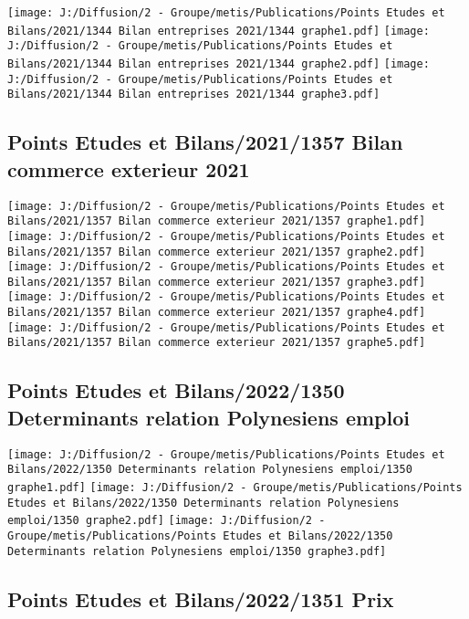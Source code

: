 \documentclass[
]{article}
\begin{document}
\texttt{[image: J:/Diffusion/2 - Groupe/metis/Publications/Points Etudes et Bilans/2021/1344 Bilan entreprises 2021/1344 graphe1.pdf]}
\texttt{[image: J:/Diffusion/2 - Groupe/metis/Publications/Points Etudes et Bilans/2021/1344 Bilan entreprises 2021/1344 graphe2.pdf]}
\texttt{[image: J:/Diffusion/2 - Groupe/metis/Publications/Points Etudes et Bilans/2021/1344 Bilan entreprises 2021/1344 graphe3.pdf]}

\hypertarget{points-etudes-et-bilans20211357-bilan-commerce-exterieur-2021}{%
\subsection{Points Etudes et Bilans/2021/1357 Bilan commerce exterieur
2021}\label{points-etudes-et-bilans20211357-bilan-commerce-exterieur-2021}}

\texttt{[image: J:/Diffusion/2 - Groupe/metis/Publications/Points Etudes et Bilans/2021/1357 Bilan commerce exterieur 2021/1357 graphe1.pdf]}
\texttt{[image: J:/Diffusion/2 - Groupe/metis/Publications/Points Etudes et Bilans/2021/1357 Bilan commerce exterieur 2021/1357 graphe2.pdf]}
\texttt{[image: J:/Diffusion/2 - Groupe/metis/Publications/Points Etudes et Bilans/2021/1357 Bilan commerce exterieur 2021/1357 graphe3.pdf]}
\texttt{[image: J:/Diffusion/2 - Groupe/metis/Publications/Points Etudes et Bilans/2021/1357 Bilan commerce exterieur 2021/1357 graphe4.pdf]}
\texttt{[image: J:/Diffusion/2 - Groupe/metis/Publications/Points Etudes et Bilans/2021/1357 Bilan commerce exterieur 2021/1357 graphe5.pdf]}

\hypertarget{points-etudes-et-bilans20221350-determinants-relation-polynesiens-emploi}{%
\subsection{Points Etudes et Bilans/2022/1350 Determinants relation
Polynesiens
emploi}\label{points-etudes-et-bilans20221350-determinants-relation-polynesiens-emploi}}

\texttt{[image: J:/Diffusion/2 - Groupe/metis/Publications/Points Etudes et Bilans/2022/1350 Determinants relation Polynesiens emploi/1350 graphe1.pdf]}
\texttt{[image: J:/Diffusion/2 - Groupe/metis/Publications/Points Etudes et Bilans/2022/1350 Determinants relation Polynesiens emploi/1350 graphe2.pdf]}
\texttt{[image: J:/Diffusion/2 - Groupe/metis/Publications/Points Etudes et Bilans/2022/1350 Determinants relation Polynesiens emploi/1350 graphe3.pdf]}

\hypertarget{points-etudes-et-bilans20221351-prix}{%
\subsection{Points Etudes et Bilans/2022/1351
Prix}\label{points-etudes-et-bilans20221351-prix}}
\end{document}
